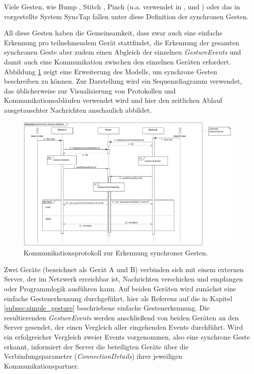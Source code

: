 Viele Gesten, wie \zb Bump \citep{Hinckley2003}, Stitch \citep{Hinckley2004}, Pinch (u.a. verwendet in \citep{Lucero2011}, \citep{Chen2014} und \citep{Nielsen2014}) oder das in \citep{Rekimoto2004} vorgestellte System SyncTap fallen unter diese Definition der synchronen Gesten. 

All diese Gesten haben die Gemeinsamkeit, dass zwar auch eine einfache Erkennung pro teilnehmendem Gerät stattfindet, die Erkennung der gesamten synchronen Geste aber zudem einen Abgleich der einzelnen \textit{GestureEvents} und damit auch eine Kommunikation zwischen den einzelnen Geräten erfordert. Abbildung \ref{fig:sync_gesture_detection} zeigt eine Erweiterung des Modells, um synchrone Gesten beschreiben zu können. Zur Darstellung wird ein Sequenzdiagramm verwendet, das üblicherweise zur Visualisierung von Protokollen und Kommunikationsabläufen verwendet wird und hier den zeitlichen Ablauf ausgetauschter Nachrichten anschaulich abbildet.
\begin{figure}
\centering
\includegraphics[width=1\textwidth, height=0.65\textheight, keepaspectratio]{bilder/synchronous_gesture_detection.pdf}
\caption{Kommunikationsprotokoll zur Erkennung synchroner Gesten.}
\label{fig:sync_gesture_detection}
\end{figure}

Zwei Geräte (bezeichnet als Gerät A und B) verbinden sich mit einem externen Server, der im Netzwerk erreichbar ist, Nachrichten verschicken und empfangen oder Programmlogik ausführen kann. Auf beiden Geräten wird zunächst eine einfache Gestenerkennung durchgeführt, hier als Referenz auf die in Kapitel \ref{subsec:simple_gesture} beschriebene einfache Gestenerkennung. Die resultierenden \textit{GestureEvents} werden anschließend von beiden Geräten an den Server gesendet, der einen Vergleich aller eingehenden Events durchführt. Wird ein erfolgreicher Vergleich zweier Events vorgenommen, also eine synchrone Geste erkannt, informiert der Server die beteiligten Geräte über die Verbindungsparameter (\textit{ConnectionDetails}) ihrer jeweiligen Kommunikationspartner.

